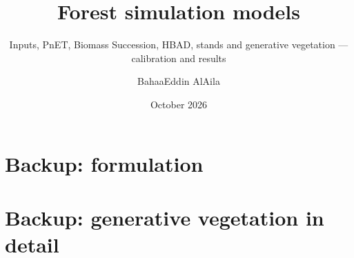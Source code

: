 \documentclass[aspectratio=169,11pt]{beamer}
\title{Forest simulation models}
\subtitle{Inputs, PnET, Biomass Succession, HBAD, stands and generative vegetation — calibration and results}
\author{BahaaEddin AlAila}
\institute{University of Georgia}
\date{October 2026}
\begin{document}
\begin{frame}
\titlepage
\end{frame}











\appendix
\section{Backup: formulation}

\section{Backup: generative vegetation in detail}

\end{document}
